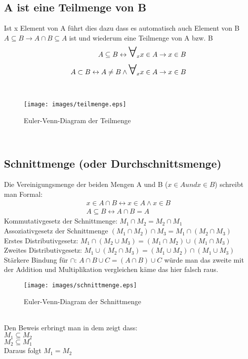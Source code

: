 \documentclass[a4paper]{scrartcl}
\newcommand\bigforall{\mbox{\huge $\forall$}}
\begin{document}
\subsection{A ist eine Teilmenge von B}
Ist x Element von A führt dies dazu dass es automatisch auch Element von B
$A \subseteq B \rightarrow A \cap B \subseteq A$
ist und wiederum eine Teilmenge von A bzw. B \\
\begin{align}
A \subseteq B \leftrightarrow \bigforall_x x \in A \rightarrow x \in B \\
A \subset B \leftrightarrow A \neq B \wedge \bigforall_x x \in A \rightarrow x \in B 
\end{align} \\
\begin{figure}[h]
\begin{center}
\texttt{[image: images/teilmenge.eps]}
\caption{Euler-Venn-Diagram der Teilmenge}
\label{labelname}
\end{center}
\end{figure} \\

\subsection{Schnittmenge (oder Durchschnittsmenge)}
Die Vereinigungsmenge der beiden Mengen A und B ($x \in A und x \in B$) schreibt man Formal: \\
\begin{align}
x \in A \cap B \leftrightarrow x \in A \wedge x \in B \\
A \subseteq B \leftrightarrow A \cap B = A
\end{align}
Kommutativgesetz der Schnittmenge: $ M_1 \cap M_2 = M_2 \cap M_1$ \\
Assoziativgesetz der Schnittmenge $ (M_1 \cap M_2) \cap M_3 = M_1 \cap (M_2 \cap M_3) $ \\
Erstes Distributivgesetz: $M_1 \cap (M_2 \cup M_3) = (M_1 \cap M_2) \cup (M_1 \cap M_3) $ \\
Zweites Distributivgesetz: $M_1 \cup (M_2 \cap M_3) = (M_1 \cup M_2) \cap (M_1 \cup M_3) $ \\
Stärkere Bindung für $\cap$: $A \cap B \cup C = (A \cap B) \cup C$
würde man das zweite mit der Addition und Multiplikation vergleichen käme das hier falsch raus.
\begin{figure}[h]
\begin{center}
\texttt{[image: images/schnittmenge.eps]}
\caption{Euler-Venn-Diagram der Schnittmenge}
\label{labelname}
\end{center}
\end{figure} \\
Den Beweis erbringt man in dem zeigt dass: \\
$M_1 \subseteq M_2$ \\
$M_2 \subseteq M_1$ \\
Daraus folgt $M_1 = M_2$ \\
\end{document}
